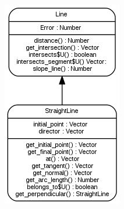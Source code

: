 \begin{figure}[H]
 \centering
 \includegraphics[scale=0.6]{../images/line_diagram.png}

 \label{fig:../images/line_diagram.png}
\end{figure}